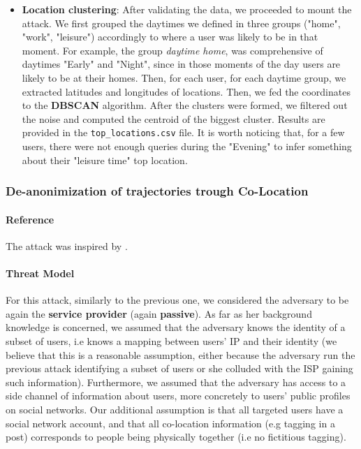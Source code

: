 \documentclass[10pt,conference,compsocconf]{IEEEtran}
\begin{document}
\begin{itemize}
    \item \textbf{Location clustering}: After validating the data, we proceeded
    to mount the attack. We first grouped the daytimes we defined in three groups ("home", "work", "leisure") accordingly to where a user was likely to be in that moment. For example, the group \textit{daytime home},
    was comprehensive of daytimes "Early" and "Night", since in those moments of the day users are likely to be at their homes. Then, for
    each user, for each daytime group, we
    extracted latitudes and longitudes of locations. Then, we fed the
    coordinates to the \textbf{DBSCAN} algorithm. After
    the clusters were formed, we filtered out the noise and computed
    the centroid of the biggest cluster. Results are provided in the \texttt{top\_locations.csv} file. It is
    worth noticing that, for a few users, there were not enough queries during
    the "Evening" to infer something about their "leisure time" top location.
\end{itemize}

\subsubsection{De-anonimization of trajectories trough Co-Location}

\paragraph{Reference}
The attack was inspired by \cite{8228621}.
\paragraph{Threat Model}
For this attack, similarly to the previous one, we considered the adversary to
be again the \textbf{service provider} (again
\textbf{passive}).
As far as her background knowledge is concerned, we assumed that the adversary
knows the identity of a subset of users, i.e knows a mapping between users' IP and their identity (we believe that this is a reasonable assumption, either because the adversary run the previous attack identifying a subset of users or she colluded with the ISP gaining such information). Furthermore, we assumed that
the adversary has access to a side channel of information about users, more
concretely to users' public profiles on social networks. Our additional assumption is that all targeted users have a social network account, and that all co-location information (e.g tagging in a post) corresponds to people being physically together (i.e no fictitious tagging).
\end{document}

